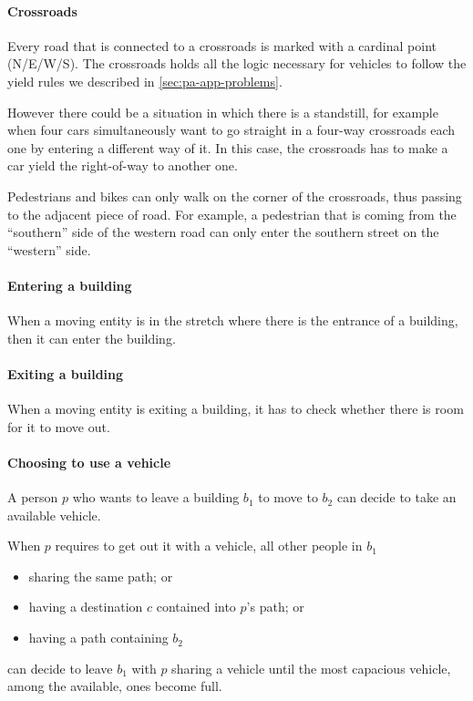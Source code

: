 \paragraph{Crossroads} Every road that is connected to a crossroads is marked
with a cardinal point (N/E/W/S). The crossroads holds all the logic necessary
for vehicles to follow the yield rules we described in
\ref{sec:pa-app-problems}.

However there could be a situation in which there is a standstill,
for example when four cars simultaneously want to go straight in
a four-way crossroads each one by entering a different way of it.
In this case, the crossroads has to make a car yield the right-of-way
to another one.

Pedestrians and bikes can only walk on the corner of the crossroads, thus
passing to the adjacent piece of road.
For example, a pedestrian that is coming from the ``southern'' side of the
western road can only enter the southern street on the ``western'' side.

\paragraph{Entering a building}
When a moving entity is in the stretch where there is the entrance of a
building, then it can enter the building.

\paragraph{Exiting a building}
When a moving entity is exiting a building, it has to check whether there is
room for it to move out.

\paragraph{Choosing to use a vehicle}
A person $p$ who wants to leave a building $b_1$ to move to $b_2$ can decide
to take an available vehicle.

When $p$ requires to get out it with a vehicle, all other people in $b_1$
\begin{itemize}
\item sharing the same path; or
\item having a destination $c$ contained into $p$'s path; or
\item having a path containing $b_2$
\end{itemize}
can decide to leave $b_1$ with $p$ sharing a vehicle
until the most capacious vehicle, among the available, ones become full.

